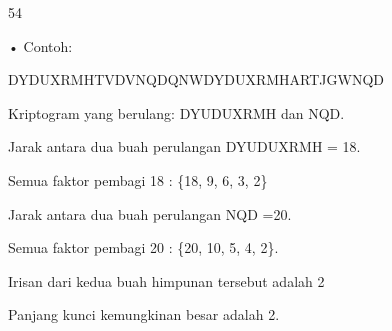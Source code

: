 \documentclass{article}
\begin{document}

54

• Contoh:

 DYDUXRMHTVDVNQDQNWDYDUXRMHARTJGWNQD

 Kriptogram yang berulang: DYUDUXRMH dan NQD. 

 Jarak antara dua buah perulangan DYUDUXRMH = 18. 

 Semua faktor pembagi 18 : \{18, 9, 6, 3, 2\}  

 Jarak antara dua buah perulangan NQD =20. 

 Semua faktor pembagi 20 : \{20, 10, 5, 4, 2\}. 

 Irisan dari kedua buah himpunan tersebut adalah 2 

 Panjang kunci kemungkinan besar adalah 2.
\end{document}
